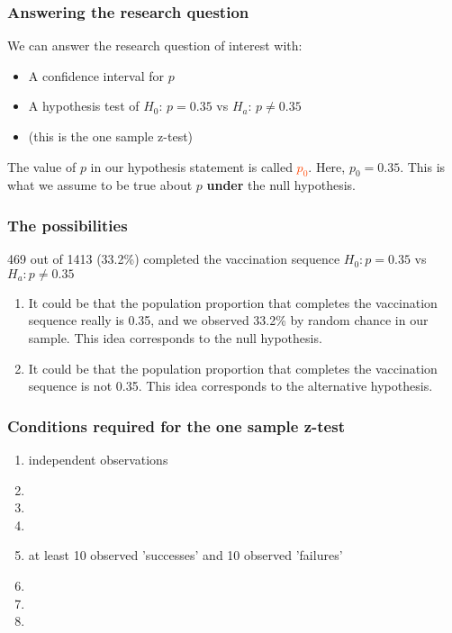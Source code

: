 \begin{frame}[fragile]
\frametitle{Answering the research question }
We can answer the research question of interest with:
\begin{itemize}
    \item
    A confidence interval for $p$
    \item
    A hypothesis test of $H_0$: $p=0.35$ vs $H_a$: $p \neq 0.35$
    \item[]
    (this is the one sample z-test)
 \end{itemize}
 \vskip10pt
    The value of $p$ in our hypothesis statement is called \textcolor{OrangeRed}{$p_0$}.  Here, $p_0=0.35$.  This is what we assume to be true about $p$ \textbf{under} the null hypothesis.

\end{frame}

\begin{frame}
\frametitle{The possibilities}
469 out of 1413 (33.2\%) completed the vaccination sequence
\vskip10pt
$H_0: p=0.35$ vs $H_a: p \neq 0.35$\\
\vskip10pt
\begin{enumerate}
    \item
    It could be that the population proportion that completes the vaccination sequence really is 0.35, and we observed 33.2\% by random chance in our sample.  This idea corresponds to the null hypothesis.
    \item
    It could be that the population proportion that completes the vaccination sequence is not 0.35.  This idea corresponds to the alternative hypothesis.
\end{enumerate}
\end{frame}

\begin{frame}
\frametitle{Conditions required for the one sample z-test}
\begin{enumerate}
    \item
    independent observations
    \item[]
    \item[]
    \item[]
    \item
    at least 10 observed 'successes' and 10 observed 'failures'
    \item[]
    \item[]
    \item[]
\end{enumerate}
\end{frame}

